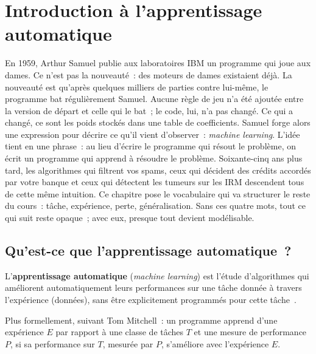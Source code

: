 \chapter{Introduction \`a l'apprentissage automatique}
\label{ch:introduction}

En 1959, Arthur Samuel publie aux laboratoires IBM un programme qui joue aux dames. Ce n'est pas la nouveaut\'e~: des moteurs de dames existaient d\'ej\`a. La nouveaut\'e est qu'apr\`es quelques milliers de parties contre lui-m\^eme, le programme bat r\'eguli\`erement Samuel. Aucune r\`egle de jeu n'a \'et\'e ajout\'ee entre la version de d\'epart et celle qui le bat~; le code, lui, n'a pas chang\'e. Ce qui a chang\'e, ce sont les poids stock\'es dans une table de coefficients. Samuel forge alors une expression pour d\'ecrire ce qu'il vient d'observer~: \emph{machine learning}. L'id\'ee tient en une phrase~: au lieu d'\'ecrire le programme qui r\'esout le probl\`eme, on \'ecrit un programme qui apprend \`a r\'esoudre le probl\`eme. Soixante-cinq ans plus tard, les algorithmes qui filtrent vos spams, ceux qui d\'ecident des cr\'edits accord\'es par votre banque et ceux qui d\'etectent les tumeurs sur les IRM descendent tous de cette m\^eme intuition. Ce chapitre pose le vocabulaire qui va structurer le reste du cours~: t\^ache, exp\'erience, perte, g\'en\'eralisation. Sans ces quatre mots, tout ce qui suit reste opaque~; avec eux, presque tout devient mod\'elisable.

\section{Qu'est-ce que l'apprentissage automatique~?}

\begin{definition}
L'\textbf{apprentissage automatique} (\emph{machine learning}) est l'\'etude
d'algorithmes qui am\'eliorent automatiquement leurs performances sur une
t\^ache donn\'ee \`a travers l'exp\'erience (donn\'ees), sans \^etre
explicitement programm\'es pour cette t\^ache~\cite{murphy2022}.
\end{definition}

Plus formellement, suivant Tom Mitchell~: un programme apprend d'une
exp\'erience $E$ par rapport \`a une classe de t\^aches $T$ et une mesure
de performance $P$, si sa performance sur $T$, mesur\'ee par $P$, s'am\'eliore
avec l'exp\'erience $E$.

